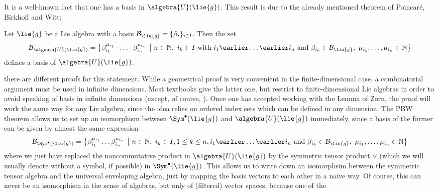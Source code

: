 It is a well-known fact that one has a basis in $\algebra{U}(\lie{g})$. This 
result is due to the already mentioned theorem of Poincar\'e, Birkhoff and 
Witt:
\begin{theorem}
	\label{Thm:Alg:PBW}
	Let $\lie{g}$ be a Lie algebra with a basis $\mathcal{B}_{\lie{g}} = \{ 
	\beta_i \}_{i \in I}$. Then the set
	\begin{equation*}
		\mathcal{B}_{\algebra{U}(\lie{g})}
		=
		\big\{
			\beta_{i_1}^{\mu_{i_1}}
			\cdot \ldots \cdot
			\beta_{i_n}^{\mu_{i_n}}
		\ \big| \
			n \in \mathbb{N}, \ 
			i_k \in I
			\text{ with } i_1 \earlier \ldots \earlier i_n 
			\text{ and } \beta_{i_k} \in \mathcal{B}_{\lie{g}}, \
			\mu_{i_1}, \ldots, \mu_{i_n} \in \mathbb{N}
		\big\}
	\end{equation*}
	defines a basis of $\algebra{U}(\lie{g})$.
\end{theorem}
there are different proofs for this statement. While a geometrical proof is 
very convenient in the finite-dimensional case, a combinatorial argument must 
be used in infinite dimensions. Most textbooks give the latter one, but 
restrict to finite-dimensional Lie algebras in order to avoid speaking of 
basis in infinite dimensions (except, of course, \cite{bourbaki:}). Once one 
has accepted working with the Lemma of Zorn, the proof will work the same way 
for any Lie algebra, since the idea relies on ordered index sets which can be 
defined in any dimension.
The PBW theorem allows us to set up an isomorphism between $\Sym^{\bullet}
(\lie{g})$ and $\algebra{U}(\lie{g})$ immediately, since a basis of the former 
can be given by almost the same expression
\begin{equation*}
	\mathcal{B}_{\Sym^{\bullet}(\lie{g})}
	=
	\big\{
		\beta_{i_1}^{\mu_{i_1}}
		\ldots
		\beta_{i_n}^{\mu_{i_n}}
	\ \big| \
		n \in \mathbb{N}, \ 
		i_k \in I, 1 \leq k \leq n,
		i_1 \earlier \ldots \earlier i_n 
		\text{ and } \beta_{i_k} \in \mathcal{B}_{\lie{g}}, \
		\mu_{i_1}, \ldots, \mu_{i_n} \in \mathbb{N}
	\big\}
\end{equation*}
where we just have replaced the noncommutative product in $\algebra{U}
(\lie{g})$ by the symmetric tensor product $\vee$ (which we will usually 
denote without a symbol, if possible) in $\Sym^{\bullet}(\lie{g})$. This 
allows us to write down an isomorphsim between the symmetric tensor algebra 
and the universal enveloping algebra, just by mapping the basis vectors to 
each other in a naive way. Of course, this can never be an isomorphism in the 
sense of algebras, but only of (filtered) vector spaces, because one of the 
